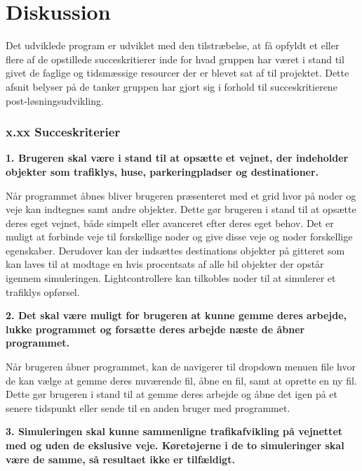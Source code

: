 \chapter{Diskussion}\label{Diskussion}



Det udviklede program er udviklet med den tilstræbelse, at få opfyldt et eller flere af de opstillede succeskritierer inde for hvad gruppen har været i stand til givet de faglige og tidsmæssige resourcer der er blevet sat af til projektet. Dette afsnit belyser på de tanker gruppen har gjort sig i forhold til succeskritierene post-løsningsudvikling.

\subsection{x.xx Succeskriterier}

\textbf{1. Brugeren skal være i stand til at opsætte et vejnet, der indeholder objekter som trafiklys, huse, parkeringpladser og destinationer.}

Når programmet åbnes bliver brugeren præsenteret med et grid hvor på noder og veje kan indtegnes samt andre objekter. Dette gør brugeren i stand til at opsætte deres eget vejnet, både simpelt eller avanceret efter deres eget behov. Det er muligt at forbinde veje til forskellige noder og give disse veje og noder forskellige egenskaber. Derudover kan der indsættes destinations objekter på gitteret som kan laves til at modtage en hvis procentsats af alle bil objekter der opstår igennem simuleringen. Lightcontrollere kan tilkobles noder til at simulerer et trafiklys opførsel.

\vspace{5mm}

\textbf{2. Det skal være muligt for brugeren at kunne gemme deres arbejde, lukke programmet og forsætte deres arbejde næste de åbner programmet.}

Når brugeren åbner programmet, kan de navigerer til dropdown menuen file hvor de kan vælge at gemme deres nuværende fil, åbne en fil, samt at oprette en ny fil. Dette gør brugeren i stand til at gemme deres arbejde og åbne det igen på et senere tidspunkt eller sende til en anden bruger med programmet.

\vspace{5mm}

\textbf{3. Simuleringen skal kunne sammenligne trafikafvikling på vejnettet med og uden de ekslusive veje. Køretøjerne i de to simuleringer skal være de samme, så resultaet ikke er tilfældigt.}

